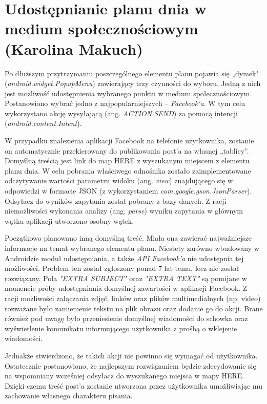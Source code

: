 \documentclass[10pt,twoside,a4paper]{report}
\begin{document}
\section{Udostępnianie planu dnia w medium społecznościowym (Karolina Makuch)}
\par  Po dłuższym przytrzymaniu poszczególnego elementu planu pojawia się „dymek"  (\textit{android.widget.PopupMenu}) zawierający trzy czynności do wyboru. Jedną z nich jest możliwość udostępnienia wybranego punktu w medium społecznościowym. Postanowiono wybrać jedno z najpopularniejszych – \textit{Facebook‘a}. W tym celu wykorzystano akcję wysyłającą (ang. \textit{ACTION.SEND}) za pomocą intencji (\textit{android.content.Intent}). 
\par  W przypadku znalezienia aplikacji Facebook na telefonie użytkownika, zostanie on automatycznie przekierowany do publikowania post’a na własnej „tablicy”. Domyślną treścią jest link do map HERE z wyszukanym miejscem z elementu planu dnia. W celu pobrania właściwego odnośnika  zostało zaimplementowane odczytywanie wartości parametru widoku (ang. \textit{view}) znajdującego się w odpowiedzi w formacie JSON (z wykorzystaniem \textit{com.google.gson.JsonParser}). Odsyłacz do wyników zapytania został pobrany z bazy danych. Z racji niemożliwości wykonania analizy (ang. \textit{parse}) wyniku zapytania w głównym wątku aplikacji utworzono osobny wątek.
\par Początkowo planowano inną domyślną treść. Miała ona zawierać najważniejsze informacje na temat wybranego elementu planu. Niestety zarówno wbudowany w Androidzie moduł  udostępniania, a także \textit{API Facebook’a} nie udostępnia tej możliwości.  Problem ten został zgłoszony ponad 7 lat temu, lecz nie został rozwiązany\cite{FacebookBug}. Pola \textit{"EXTRA SUBJECT"} oraz \textit{"EXTRA TEXT"} są pomijane w momencie próby udostępniania domyślnej zawartości w aplikacji Facebook. Z racji możliwości załączania zdjęć, linków oraz plików multimedialnych (np. video) rozważane było zamienienie tekstu na plik obrazu oraz dodanie go do akcji. Brane również pod uwagę było przeniesienie domyślnej wiadomości do schowka oraz wyświetlenie komunikatu informującego użytkownika z prośbą o wklejenie wiadomości.
\par Jednakże stwierdzono, że takich akcji nie powinno się wymagać od użytkownika.  Ostatecznie postanowiono, że najlepszym rozwiązaniem będzie zdecydowanie się na wspomniany wcześniej odsyłacz do wyszukanego miejsca w mapy HERE\cite{mobileHere}. Dzięki czemu  treść post’a zostanie utworzona przez użytkownika umożliwiając mu zachowanie własnego charakteru pisania.
\end{document}
